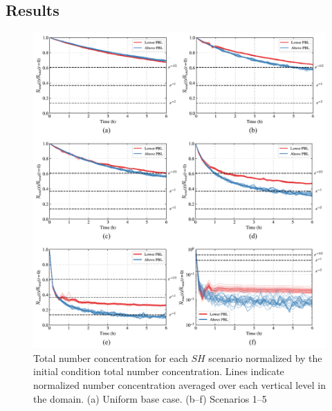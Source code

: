 \subsection{Results}\label{ideal-coag-results}

\begin{figure}[!h]
  \centering
    \includegraphics[width=\textwidth]{figures/chapter5/ideal-coag/NumConcTimescale_composite.pdf}
    \caption{Total number concentration for each $SH$ scenario normalized by the initial condition total number concentration. Lines indicate normalized number concentration averaged over each vertical level in the domain. (a) Uniform base case. (b--f) Scenarios 1--5}
    \label{fig:numconc-timescales}
\end{figure}

